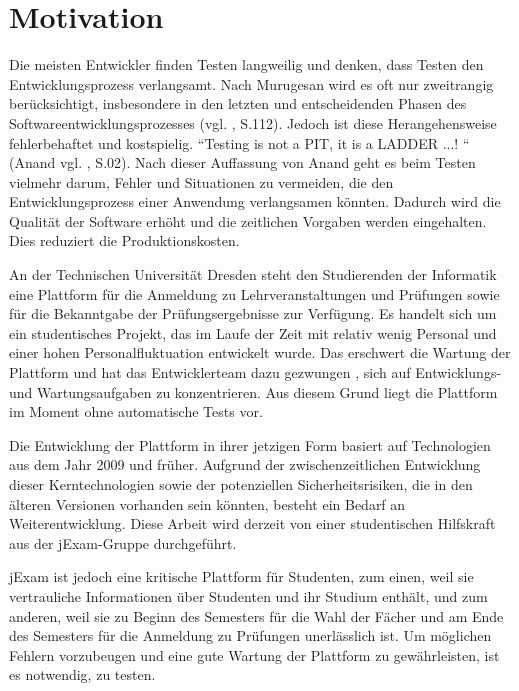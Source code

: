 \section{Motivation}

Die meisten Entwickler finden Testen langweilig und denken, dass Testen den
Entwicklungsprozess verlangsamt. Nach Murugesan  wird es oft nur zweitrangig
berücksichtigt, insbesondere in den letzten und entscheidenden Phasen des
Softwareentwicklungsprozesses (vgl. \cite{526394}, S.112). Jedoch ist diese
Herangehensweise fehlerbehaftet und kostspielig. “Testing is not a PIT, it is a
LADDER ...! “ (Anand vgl. \cite{anand12importance} , S.02). Nach dieser Auffassung von
Anand geht es beim Testen vielmehr darum, Fehler und Situationen zu vermeiden,
die den Entwicklungsprozess einer Anwendung verlangsamen könnten.
Dadurch wird die Qualität der Software erhöht und die zeitlichen Vorgaben
werden eingehalten. Dies reduziert die Produktionskosten.


An der Technischen Universität Dresden steht den Studierenden der Informatik eine
Plattform für die Anmeldung zu Lehrveranstaltungen und Prüfungen sowie für die
Bekanntgabe der Prüfungsergebnisse zur Verfügung. Es handelt sich um ein
studentisches Projekt, das im Laufe der Zeit mit relativ wenig Personal
und einer hohen Personalfluktuation entwickelt wurde.  Das erschwert die
Wartung der Plattform und hat das Entwicklerteam dazu gezwungen , sich auf
Entwicklungs- und Wartungsaufgaben zu konzentrieren. Aus diesem Grund liegt
die Plattform im Moment ohne automatische Tests vor.


Die Entwicklung der Plattform in ihrer jetzigen Form basiert auf Technologien aus
dem Jahr 2009 und früher. Aufgrund der zwischenzeitlichen Entwicklung dieser
Kerntechnologien sowie der potenziellen Sicherheitsrisiken, die in den älteren
Versionen vorhanden sein könnten, besteht ein Bedarf an Weiterentwicklung.
Diese Arbeit wird derzeit von einer studentischen Hilfskraft aus der jExam-Gruppe
durchgeführt.


jExam ist jedoch eine kritische Plattform für Studenten, zum einen, weil sie
vertrauliche Informationen über Studenten und ihr Studium enthält, und zum
anderen, weil sie zu Beginn des Semesters für die Wahl der Fächer und am Ende
des Semesters für die Anmeldung zu Prüfungen unerlässlich ist. Um möglichen
Fehlern vorzubeugen und eine gute Wartung der Plattform zu gewährleisten, ist
es notwendig, zu testen.


